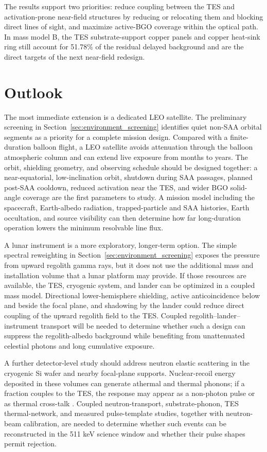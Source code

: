 \documentclass[11pt]{article}
\begin{document}
The results support two priorities: reduce coupling between the TES and
activation-prone near-field structures by reducing or relocating them and
blocking direct lines of sight, and maximize active-BGO coverage within the
optical path. In mass model B, the TES
substrate-support copper panels and copper heat-sink ring still account for
51.78\% of the residual delayed background and are the direct targets of the
next near-field redesign.

\section{Outlook}
\label{sec:outlook}

The most immediate extension is a dedicated LEO satellite. The preliminary
screening in Section~\ref{sec:environment_screening} identifies quiet non-SAA
orbital segments as a priority for a complete mission design. Compared with a
finite-duration balloon flight, a LEO satellite avoids attenuation through the
balloon atmospheric column and can extend live exposure from months to years.
The orbit, shielding geometry, and observing schedule should be designed
together: a near-equatorial, low-inclination orbit, shutdown during SAA
passages, planned post-SAA cooldown, reduced activation near the TES, and wider
BGO solid-angle coverage are the first parameters to study. A mission model
including the spacecraft, Earth-albedo radiation, trapped-particle and SAA
histories, Earth occultation, and source visibility can then determine how far
long-duration operation lowers the minimum resolvable line flux.

A lunar instrument is a more exploratory, longer-term option. The simple
spectral reweighting in Section~\ref{sec:environment_screening} exposes the
pressure from upward regolith gamma rays, but it does not use the additional
mass and installation volume that a lunar platform may provide. If those
resources are available, the TES, cryogenic system, and lander can be optimized
in a coupled mass model. Directional lower-hemisphere shielding, active
anticoincidence below and beside the focal plane, and shadowing by the lander
could reduce direct coupling of the upward regolith field to the TES. Coupled
regolith--lander--instrument transport will be needed to determine whether such
a design can suppress the regolith-albedo background while benefiting from
unattenuated celestial photons and long cumulative exposure.

\newpage
\begin{samepage}
A further detector-level study should address neutron elastic scattering in
the cryogenic Si wafer and nearby focal-plane supports. Nuclear-recoil energy
deposited in these volumes can generate athermal and thermal phonons; if a
fraction couples to the TES, the response may appear as a non-photon pulse or
as thermal cross-talk \cite{Agnese2018NuclearRecoil,Hull2023ThermalBackground}.
Coupled neutron-transport, substrate-phonon, TES thermal-network, and measured
pulse-template studies, together with neutron-beam calibration, are needed to
determine whether such events can be reconstructed in the 511 keV science
window and whether their pulse shapes permit rejection.
\end{samepage}
\end{document}
